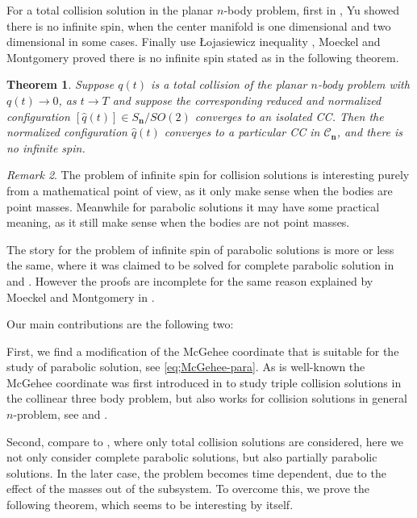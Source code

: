 \documentclass[11pt]{amsart}
\newtheorem{theorem}{Theorem}[section]
\theoremstyle{definition}
\theoremstyle{remark}
\newtheorem{remark}[theorem]{Remark}
\numberwithin{equation}{section}
\newcommand{\scc}{\mathscr C}
\newcommand{\bn}{\mathbf n}
\begin{document}
For a total collision solution in the planar $n$-body problem, first in \cite{Yu24}, Yu showed there is no infinite spin, when the center manifold is one dimensional and two dimensional in some cases. Finally use \L ojasiewicz inequality \cite{Lj82}, Moeckel and Montgomery \cite{MM25} proved there is no infinite spin stated as in the following theorem. 
\begin{theorem}{\cite[Theorem 1.2]{MM25}}
	\label{thm;total-coll:label} Suppose $q(t)$ is a total collision of the planar $n$-body problem with $q(t) \to 0$, as $t \to T$ and suppose the corresponding reduced and normalized configuration $[\hat{q}(t)] \in S_{\bn}/ SO(2)$ converges to an isolated CC. Then the normalized configuration $\hat{q}(t)$ converges to a particular CC in $\scc_{\bn}$, and there is no infinite spin. 
\end{theorem}

\begin{remark}
The problem of infinite spin for collision solutions is interesting purely from a mathematical point of view, as it only make sense when the bodies are point masses. Meanwhile for parabolic solutions it may have some practical meaning, as it still make sense when the bodies are not point masses. 
\end{remark}

The story for the problem of infinite spin of parabolic solutions is more or less the same, where it was claimed to be solved for complete parabolic solution in \cite{SH81} and \cite{Sr84}. However the proofs are incomplete for the same reason explained by Moeckel and Montgomery in \cite{MM25}. 

Our main contributions are the following two: 

First, we find a modification of the McGehee coordinate that is suitable for the study of parabolic solution, see \eqref{eq;McGehee-para}. As is well-known the McGehee coordinate was first introduced in \cite{Mg74} to study triple collision solutions in the collinear three body problem, but also works for collision solutions in general $n$-problem, see \cite{Mk89} and \cite{Eb90}. 


Second, compare to \cite{MM25}, where only total collision solutions are considered,  here we not only consider complete parabolic solutions, but also partially parabolic solutions. In the later case, the problem becomes time dependent, due to the effect of the masses out of the subsystem. To overcome this, we prove the following theorem, which seems to be interesting by itself.   
\end{document}
